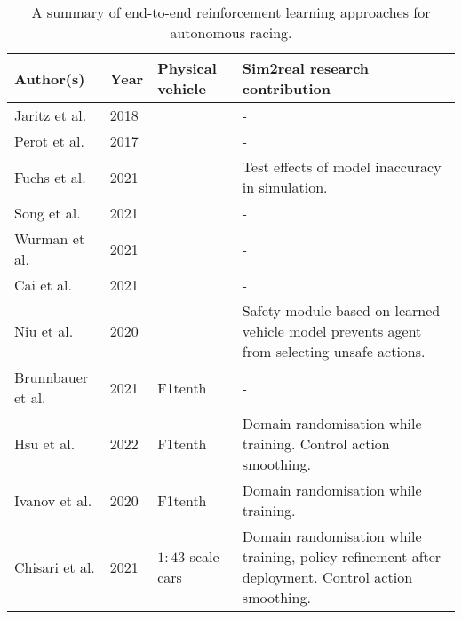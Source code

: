 

\begin{table}[htb!]
\centering
\renewcommand{\arraystretch}{1.5}
\begin{tabularx}{0.9\textwidth}{R Y M L}
    \hline
    \small \textbf{Author(s)} & \small \textbf{Year} & \small \textbf{Physical \mbox{vehicle}} & \small \textbf{Sim2real research contribution} \\
    \hline
   
    \small Jaritz et al. \cite{Jaritz2018} & \small 2018 & & - \\

    \small Perot et al. \cite{Perot2017} & \small  2017 & & - \\

    \small Fuchs et al. \cite{Fuchs2021} & \small 2021 & & \small Test effects of model inaccuracy in simulation. \\

    \small Song et al. \cite{Fuchs2021} & \small 2021 & & - \\

    \small Wurman et al. \cite{Wurman2022} & \small 2021 & & - \\

    \small Cai et al. \cite{Cai2020} & \small 2021 & & - \\

    \small Niu et al. \cite{Niu2020} & \small 2020 & & \small Safety module based on learned vehicle model prevents agent from selecting unsafe actions. \\
    
    \small Brunnbauer et al. \cite{brunnbauer2021} & \small 2021 & F1tenth & - \\

    \small Hsu et al. \cite{hsu2022} & \small 2022 & F1tenth & \small Domain randomisation while training. Control action smoothing. \\

    \small Ivanov et al. \cite{Ivanov2020} & \small 2020 & F1tenth & \small Domain randomisation while training. \\

    \small Chisari et al. \cite{Chisari2021} & \small 2021 & $1:43$ scale cars & \small Domain randomisation while training, policy refinement after deployment. Control action smoothing.\\

    \hline

\end{tabularx}
\caption[A summary of end-to-end reinforcement learning approaches for autonomous racing]{A summary of end-to-end reinforcement learning approaches for autonomous racing. }
\label{table:autonomous_racing_rl_summary}
\end{table} 
